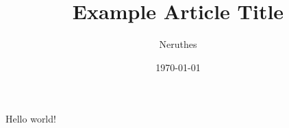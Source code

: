\documentclass[12pt,a4paper]{article}
\title{Example Article Title}
\author{Neruthes}
\date{\today}
\begin{document}
\maketitle

Hello world!

\lipsum[1-3][1-5]
\end{document}
